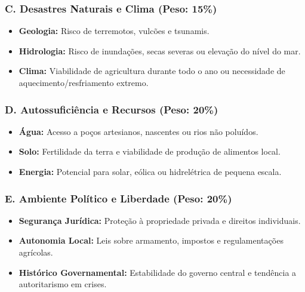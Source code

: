 \subsubsection{C. Desastres Naturais e Clima (Peso:
15\%)}\label{c.-desastres-naturais-e-clima-peso-15}

\begin{itemize}
\tightlist
\item
  \textbf{Geologia:} Risco de terremotos, vulcões e tsunamis.
\item
  \textbf{Hidrologia:} Risco de inundações, secas severas ou elevação do
  nível do mar.
\item
  \textbf{Clima:} Viabilidade de agricultura durante todo o ano ou
  necessidade de aquecimento/\allowbreak \allowbreak resfriamento extremo.
\end{itemize}

\subsubsection{D. Autossuficiência e Recursos (Peso:
20\%)}\label{d.-autossuficiuxeancia-e-recursos-peso-20}

\begin{itemize}
\tightlist
\item
  \textbf{Água:} Acesso a poços artesianos, nascentes ou rios não
  poluídos.
\item
  \textbf{Solo:} Fertilidade da terra e viabilidade de produção de
  alimentos local.
\item
  \textbf{Energia:} Potencial para solar, eólica ou hidrelétrica de
  pequena escala.
\end{itemize}

\subsubsection{E. Ambiente Político e Liberdade (Peso:
20\%)}\label{e.-ambiente-poluxedtico-e-liberdade-peso-20}

\begin{itemize}
\tightlist
\item
  \textbf{Segurança Jurídica:} Proteção à propriedade privada e direitos
  individuais.
\item
  \textbf{Autonomia Local:} Leis sobre armamento, impostos e
  regulamentações agrícolas.
\item
  \textbf{Histórico Governamental:} Estabilidade do governo central e
  tendência a autoritarismo em crises.
\end{itemize}

